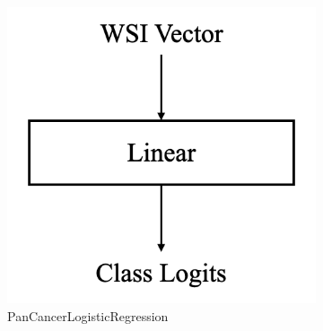 \documentclass{l4proj}
\begin{document}
\begin{figure}[] 
    \centering
    \begin{subfigure}[b]{0.3\textwidth}
        \includegraphics[width=\textwidth]{images/logreg.png}
        \caption{PanCancerLogisticRegression}
        \label{fig:logisticregression}
    \end{subfigure}
    \quad
    \begin{subfigure}[b]{0.3\textwidth}

\end{subfigure}
\end{figure}
\end{document}
